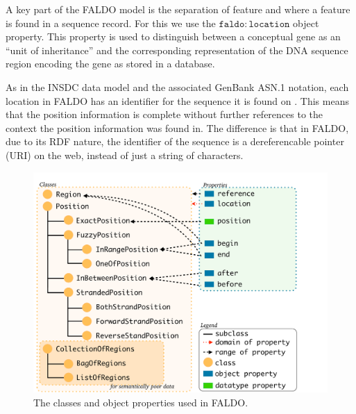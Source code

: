 A key part of the FALDO model is the separation of feature and where a feature is found in a sequence record.
For this we use the $\mathtt{faldo\colon{}location}$ object property. 
This property is used to distinguish between a conceptual gene as an ``unit of inheritance'' and the corresponding representation of the DNA sequence region encoding the gene as stored in a database.

As in the INSDC data model and the associated GenBank ASN.1 notation,
each location in FALDO has an identifier for the sequence it is found on \cite{NCBI}.
This means that the position information is complete without further references to the context the position information was found in.
The difference is that in FALDO, due to its RDF nature, the identifier of the sequence is a dereferencable pointer (URI) on the web, instead of just a string of characters.


\begin{figure}
\begin{center}
\includegraphics[width=17cm]{figures/ClassDiagram.pdf}
\end{center}
\caption{The classes and object properties used in FALDO.}
\label{fig:ontology}
\end{figure}



